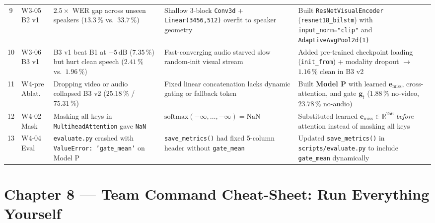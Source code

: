 \documentclass[11pt,a4paper]{article}
\newcommand{\code}[1]{\texttt{\small #1}}
\begin{document}
\begin{table}[H]
\begin{tabularx}{\textwidth}{@{}cL{1.8cm}L{3.8cm}L{3.9cm}X@{}}
9 & W3-05 B2 v1 & $2.5\times$ WER gap across unseen speakers ($13.3\,\%$ vs.\ $33.7\,\%$) & Shallow 3-block \code{Conv3d} + \code{Linear(3456,512)} overfit to speaker geometry & Built \code{ResNetVisualEncoder} (\code{resnet18\_bilstm}) with \code{input\_norm="clip"} and \code{AdaptiveAvgPool2d(1)} \\
10 & W3-06 B3 v1 & B3 v1 beat B1 at $-5\,\text{dB}$ ($7.35\,\%$) but hurt clean speech ($2.41\,\%$ vs.\ $1.96\,\%$) & Fast-converging audio starved slow random-init visual stream & Added pre-trained checkpoint loading (\code{init\_from}) + modality dropout $\to$ $1.16\,\%$ clean in B3 v2 \\
11 & W4-pre Ablat. & Dropping video or audio collapsed B3 v2 ($25.18\,\%$ / $75.31\,\%$) & Fixed linear concatenation lacks dynamic gating or fallback token & Built \textbf{Model P} with learned $\mathbf{e}_{\text{miss}}$, cross-attention, and gate $\mathbf{g}_t$ ($1.88\,\%$ no-video, $23.78\,\%$ no-audio) \\
12 & W4-02 Mask & Masking all keys in \code{MultiheadAttention} gave \code{NaN} & $\text{softmax}(-\infty,\dots,-\infty) = \text{NaN}$ & Substituted learned $\mathbf{e}_{\text{miss}} \in \mathbb{R}^{256}$ \emph{before} attention instead of masking all keys \\
13 & W4-04 Eval & \code{evaluate.py} crashed with \code{ValueError: 'gate\_mean'} on Model P & \code{save\_metrics()} had fixed 5-column header without \code{gate\_mean} & Updated \code{save\_metrics()} in \code{scripts/evaluate.py} to include \code{gate\_mean} dynamically \\
\bottomrule
\end{tabularx}
\end{table}

\section{Chapter 8 --- Team Command Cheat-Sheet: Run Everything Yourself}
\end{document}
